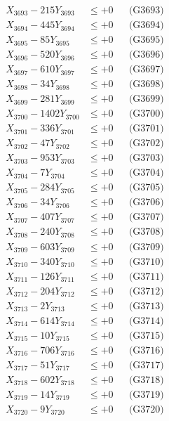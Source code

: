 \documentclass[a4paper,10pt]{article}
\begin{document}
{\begin{align}
X_{3693} - 215Y_{3693} &\leq +0 && \text{(G3693)} \\
X_{3694} - 445Y_{3694} &\leq +0 && \text{(G3694)} \\
X_{3695} - 85Y_{3695} &\leq +0 && \text{(G3695)} \\
X_{3696} - 520Y_{3696} &\leq +0 && \text{(G3696)} \\
X_{3697} - 610Y_{3697} &\leq +0 && \text{(G3697)} \\
X_{3698} - 34Y_{3698} &\leq +0 && \text{(G3698)} \\
X_{3699} - 281Y_{3699} &\leq +0 && \text{(G3699)} \\
X_{3700} - 1402Y_{3700} &\leq +0 && \text{(G3700)} \\
\allowbreak
X_{3701} - 336Y_{3701} &\leq +0 && \text{(G3701)} \\
X_{3702} - 47Y_{3702} &\leq +0 && \text{(G3702)} \\
X_{3703} - 953Y_{3703} &\leq +0 && \text{(G3703)} \\
X_{3704} - 7Y_{3704} &\leq +0 && \text{(G3704)} \\
X_{3705} - 284Y_{3705} &\leq +0 && \text{(G3705)} \\
X_{3706} - 34Y_{3706} &\leq +0 && \text{(G3706)} \\
X_{3707} - 407Y_{3707} &\leq +0 && \text{(G3707)} \\
X_{3708} - 240Y_{3708} &\leq +0 && \text{(G3708)} \\
X_{3709} - 603Y_{3709} &\leq +0 && \text{(G3709)} \\
X_{3710} - 340Y_{3710} &\leq +0 && \text{(G3710)} \\
\allowbreak
X_{3711} - 126Y_{3711} &\leq +0 && \text{(G3711)} \\
X_{3712} - 204Y_{3712} &\leq +0 && \text{(G3712)} \\
X_{3713} - 2Y_{3713} &\leq +0 && \text{(G3713)} \\
X_{3714} - 614Y_{3714} &\leq +0 && \text{(G3714)} \\
X_{3715} - 10Y_{3715} &\leq +0 && \text{(G3715)} \\
X_{3716} - 706Y_{3716} &\leq +0 && \text{(G3716)} \\
X_{3717} - 51Y_{3717} &\leq +0 && \text{(G3717)} \\
X_{3718} - 602Y_{3718} &\leq +0 && \text{(G3718)} \\
X_{3719} - 14Y_{3719} &\leq +0 && \text{(G3719)} \\
X_{3720} - 9Y_{3720} &\leq +0 && \text{(G3720)} \\

\end{align}}
\end{document}
